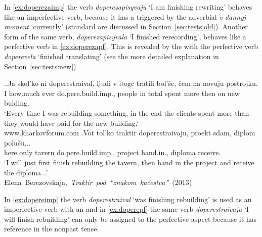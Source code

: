 In \ref{ex:doperezaimp} the verb \textit{doperezapisyvaju} `I am finishing rewriting' behaves like an imperfective verb, because it has a  triggered by the adverbial \textit{v dannyj moment} `currently' (standard  are discussed in Section~\ref{sec:tests:old}). Another form of the same verb, \textit{doperezapisyvala} `I finished rerecording', behaves like a perfective verb in \ref{ex:doperezapf}. This is revealed by the  with the perfective verb \textit{doperevela} `finished translating' (see the more detailed explanation in Section~\ref{sec:tests:new}).

\ex.\ag.\label{ex:dopereimp}Ja skol'ko ni doperestraival, ljudi v itoge tratili bol'\v{s}e, \v{c}em na novuju postrojku.\\
I how.much ever do.pere.build.imp., people in total spent more then on new bulding.\\
\trans `Every time I was rebuilding something, in the end the clients spent more than they would have paid for the new building.'\\
\hbox{}\hfill\hbox{www.kharkovforum.com}
\bg.\label{ex:doperepf}Vot tol'ko traktir doperestraivaju, proekt sdam, diplom polu\v{c}u...\\
here only tavern do.pere.build.imp., project hand.in., diploma receive.\\
\trans `I will just first finish rebuilding the tavern, then hand in the project and receive the diploma...'\\
\hbox{}\hfill\hbox{Elena Berezovskaja, \textit{Traktir pod ``znakom ka\v{c}estva''} (2013)}

In \ref{ex:dopereimp} the verb \textit{doperestraival} `was finishing rebuilding' is used as an imperfective verb with an  and in \ref{ex:doperepf} the same verb \textit{doperestraivaju} `I will finish rebuilding' can only be assigned to the perfective aspect because it has  reference in the nonpast tense.

